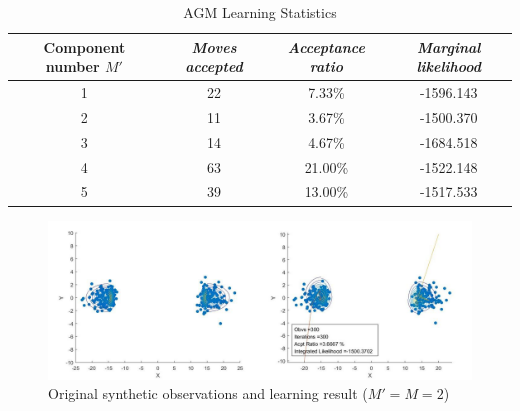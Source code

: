\documentclass[conference]{llncs}
\begin{document}
 
\begin{table}
\caption{AGM Learning Statistics}
\begin{center}
\begin{tabular}{|c|c|c|c|}
\hline
\multicolumn{1}{|p{2cm}|}{\centering \textbf{Component number $M'$}} & \multicolumn{1}{|p{2cm}|}{\centering \textbf{\textit{Moves accepted}}} & \multicolumn{1}{|p{2cm}|}{\centering \textbf{\textit{Acceptance ratio}}} & \multicolumn{1}{|p{2cm}|}{\centering \textbf{\textit{Marginal likelihood}}}\\
\hline
1 & 22 & 7.33\% & -1596.143  \\
2 & 11 & 3.67\% & -1500.370 \\
3 & 14 & 4.67\% & -1684.518 \\
4 & 63 & 21.00\% & -1522.148 \\
5 & 39 & 13.00\% & -1517.533 \\
\hline
\end{tabular}
\label{tab1}
\end{center}
\end{table}

\bigskip

\begin{figure}
\centering
\includegraphics[width=0.6\paperwidth]{02.jpg}
\caption{Original synthetic observations and learning result ($M' = M = 2$)}
\label{fig:1}
\end{figure}

\bigskip
\end{document}
